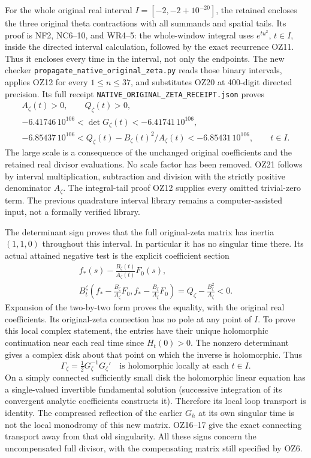 For the whole original real interval \(I=[-2,-2+10^{-20}]\),
the retained  encloses
the three original theta contractions with all summands and spatial
tails. Its proof is NF2, NC6--10, and WR4--5: the whole-window
integral uses \(e^{tu^2}\), \(t\in I\), inside the directed
interval calculation, followed by the exact recurrence OZ11.
Thus it encloses every time in the interval, not only the endpoints.
The new checker \texttt{propagate\_native\_original\_zeta.py}
reads those binary intervals, applies OZ12 for every \(1\le n\le37\),
and substitutes OZ20 at 400-digit directed precision. Its full
receipt \texttt{NATIVE\_ORIGINAL\_ZETA\_RECEIPT.json} proves
\[
 \begin{gathered}
 A_\zeta(t)>0,\qquad Q_\zeta(t)>0,\\
 -6.41746\,10^{106}
   <\det G_\zeta(t)<-6.41741\,10^{106},\\
 -6.85437\,10^{106}
   <Q_\zeta(t)-B_\zeta(t)^2/A_\zeta(t)
   <-6.85431\,10^{106},\qquad t\in I .
 \end{gathered}\tag{OZ21}
\]
The large scale is a consequence of the unchanged original
coefficients and the retained real divisor evaluations. No scale
factor has been removed. OZ21 follows by interval multiplication,
subtraction and division with the strictly positive denominator
\(A_\zeta\). The integral-tail proof OZ12 supplies every omitted
trivial-zero term. The previous quadrature interval library remains
a computer-assisted input, not a formally verified library.

The determinant sign proves that the full original-zeta matrix has
inertia \((1,1,0)\) throughout this interval. In particular it has
no singular time there. Its actual attained negative test is the
explicit coefficient section
\[
 \begin{gathered}
 f_*(s)-\frac{B_\zeta(t)}{A_\zeta(t)}F_0(s),\\
 B_t^\zeta\left(f_*-\frac{B_\zeta}{A_\zeta}F_0,
                    f_*-\frac{B_\zeta}{A_\zeta}F_0\right)
 =Q_\zeta-\frac{B_\zeta^2}{A_\zeta}<0.
 \end{gathered}\tag{OZ22}
\]
Expansion of the two-by-two form proves the equality, with the
original real coefficients. Its original-zeta connection has no
pole at any point of \(I\). To prove this local complex statement,
the entries have their unique holomorphic continuation near each
real time since \(H_t(0)>0\). The nonzero determinant gives a
complex disk about that point on which the inverse is holomorphic.
Thus
\[
 \Gamma_\zeta=\tfrac12G_\zeta^{-1}G_\zeta'
 \quad\text{is holomorphic locally at each }t\in I.             \tag{OZ23}
\]
On a simply connected sufficiently small disk the holomorphic
linear equation has a single-valued invertible fundamental solution
(successive integration of its convergent analytic coefficients
constructs it). Therefore its local loop transport is identity.
The compressed reflection of the earlier \(G_h\) at its own
singular time is not the local monodromy of this new matrix.
OZ16--17 give the exact connecting transport away from that old
singularity. All these signs concern the uncompensated full
divisor, with the compensating matrix still specified by OZ6.

